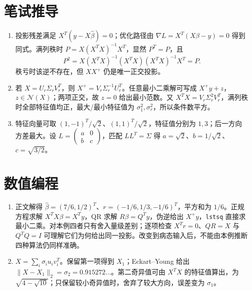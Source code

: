\section*{笔试推导}
\begin{enumerate}[leftmargin=*]
  \item 投影残差满足 $X^T(y-X\hat\beta)=0$；优化路径由 $\nabla L=X^T(X\beta-y)=0$ 得到同式。满列秩时 $P=X(X^TX)^{-1}X^T$，显然 $P^T=P$，且
  \[
    P^2=X(X^TX)^{-1}(X^TX)(X^TX)^{-1}X^T=P.
  \]
  秩亏时该逆不存在，但 $XX^+$ 仍是唯一正交投影。
  \item 若 $X=U_r\Sigma_rV_r^T$，则 $X^+=V_r\Sigma_r^{-1}U_r^T$。任意最小二乘解可写成 $X^+y+z$，$z\in\mathcal N(X)$；两项正交，故 $z=0$ 给出最小范数。又 $X^TX=V_r\Sigma_r^2V_r^T$，满列秩时全部特征值均正，最大/最小特征值为 $\sigma_1^2,\sigma_r^2$，所以条件数平方。
  \item 特征向量可取 $(1,-1)^T/\sqrt2$、$(1,1)^T/\sqrt2$，特征值分别为 $1,3$；后一方向方差最大。设 $L=\left(\begin{smallmatrix}a&0\\b&c\end{smallmatrix}\right)$，匹配 $LL^T=\Sigma$ 得 $a=\sqrt2$、$b=1/\sqrt2$、$c=\sqrt{3/2}$。
\end{enumerate}

\section*{数值编程}
\begin{enumerate}[leftmargin=*]
  \item 正文解得 $\hat\beta=(7/6,1/2)^T$、$r=(-1/6,1/3,-1/6)^T$，平方和为 $1/6$。正规方程求解 $X^TX\beta=X^Ty$，QR 求解 $R\beta=Q^Ty$，伪逆给出 $X^+y$，\texttt{lstsq} 直接求最小二乘。对本例四者只有舍入量级差别；逐项检查 $X^Tr=0$、$QR=X$ 与 $Q^TQ=I$ 可理解它们为何给出同一投影。改变到病态输入后，不能由本例推断四种算法仍同样准确。


  \item $X=\sum_i\sigma_iu_iv_i^T$。保留第一项得到 $X_1$；Eckart--Young 给出 $\lVert X-X_1\rVert_2=\sigma_2=0.915272\ldots$。第二奇异值可由 $X^TX$ 的特征值算出，为 $\sqrt{4-\sqrt{10}}$；只保留较小奇异值时，舍弃了较大方向，误差变为 $\sigma_1$。
\end{enumerate}

